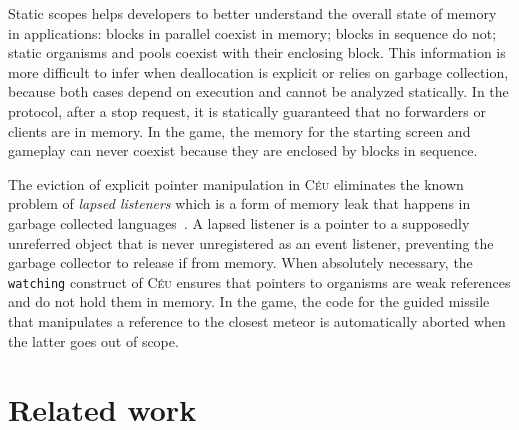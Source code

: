 \documentclass{sigplanconf}
\newcommand{\CEU}{\textsc{C\'{e}u}\xspace}
\newcommand{\code}[1] {{\small{\texttt{#1}}}}
\newcommand{\1}{\;}
\newcommand{\2}{\;\;}
\newcommand{\3}{\;\;\;}
\newcommand{\5}{\;\;\;\;\;}
\begin{document}
Static scopes helps developers to better understand the overall state of memory 
in applications: blocks in parallel coexist in memory; blocks in sequence do 
not; static organisms and pools coexist with their enclosing block.
%
This information is more difficult to infer when deallocation is explicit or 
relies on garbage collection, because both cases depend on execution and cannot 
be analyzed statically.
%
In the protocol, after a stop request, it is statically guaranteed that no 
forwarders or clients are in memory.
In the game, the memory for the starting screen and gameplay can never coexist 
because they are enclosed by blocks in sequence.

The eviction of explicit pointer manipulation in \CEU eliminates the known 
problem of \emph{lapsed listeners} which is a form of memory leak that happens 
in garbage collected languages~\cite{gamepatterns,dobbs.loiterers}.
%
A lapsed listener is a pointer to a supposedly unreferred object that is never 
unregistered as an event listener, preventing the garbage collector to release 
if from memory.
%
When absolutely necessary, the \code{watching} construct of \CEU ensures that 
pointers to organisms are weak references and do not hold them in memory.
%
In the game, the code for the guided missile that manipulates a reference to 
the closest meteor is automatically aborted when the latter goes out of scope.

\section{Related work}
\label{sec.related}

\end{document}
